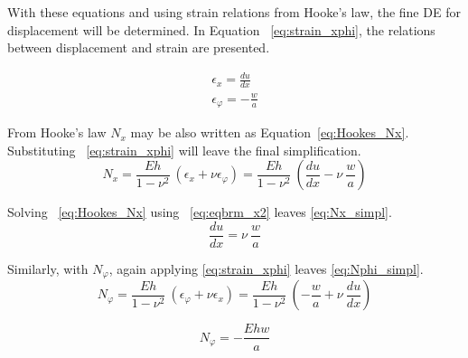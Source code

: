 With these equations and using strain relations from Hooke's law, the fine DE for displacement will be determined. In Equation ~\ref{eq:strain_xphi}, the relations between displacement and strain are presented.

\begin{equation}
\label{eq:strain_xphi}
	\begin{aligned}
		\epsilon_x = \frac{du}{dx}\\
		\epsilon_\varphi = -\frac{w}{a}
	\end{aligned}
\end{equation}

From Hooke's law $N_x$ may be also written as Equation~\ref{eq:Hookes_Nx}. Substituting ~\ref{eq:strain_xphi} will leave the final simplification.
\begin{equation}
\label{eq:Hookes_Nx}
	N_x = \frac{Eh}{1-\nu^2}\ \left( \epsilon_x + \nu \epsilon_\varphi \right) =  \frac{Eh}{1-\nu^2}\ \left( \frac{du}{dx} -\nu \ \frac{w}{a} \right)
\end{equation} 

Solving ~\ref{eq:Hookes_Nx} using ~\ref{eq:eqbrm_x2} leaves \ref{eq:Nx_simpl}.
\begin{equation}
\label{eq:Nx_simpl}
	\frac{du}{dx} =  \nu \ \frac{w}{a}
\end{equation} 

Similarly, with $N_\varphi$, again applying \ref{eq:strain_xphi} leaves \ref{eq:Nphi_simpl}.
\begin{equation}
\label{eq:Hookes_Nphi}
	N_\varphi = \frac{Eh}{1-\nu^2}\ \left( \epsilon_\varphi + \nu \epsilon_x \right) = \frac{Eh}{1-\nu^2}\  \left( -\frac{w}{a}+\nu \ \frac{du}{dx} \right)
\end{equation} 

\begin{equation}
\label{eq:Nphi_simpl}
	N_\varphi = - \frac{Ehw}{a}
\end{equation} 

